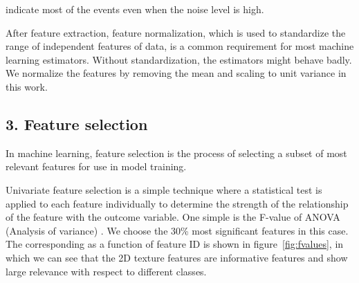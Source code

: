 indicate most of the events even when the noise level is high. 

After feature extraction, feature normalization, which is used to standardize the range of independent features of data, is a common requirement for most machine learning estimators. Without standardization, the estimators might behave badly. We normalize the features by removing the mean and scaling to unit variance in this work.

\subsection{3. Feature selection}
In machine learning, feature selection is the process of selecting a subset of most relevant features for use in model training.   

Univariate feature selection is a simple technique where a statistical test is applied to each feature individually to determine the strength of the relationship of the feature with the outcome variable. One simple  is the F-value of ANOVA (Analysis of variance) \citep{scheffe1967analysis}. We choose the 30\% most significant features in this case. The corresponding  as a function of feature ID is shown in figure~\ref{fig:fvalues}, in which we can see that the 2D texture features are informative features and show large relevance with respect to different classes.  

